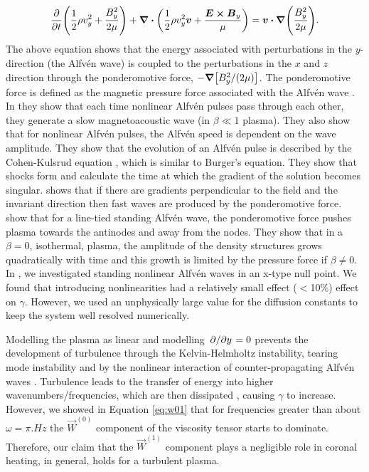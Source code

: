\begin{equation}
    \pdv{}{t}\qty(\frac{1}{2}\rho v_y^2 + \frac{B_y^2}{2\mu}) + \div(\frac{1}{2}\rho v_y^2 \vec{v} + \frac{\vec{E}\cross\vec{B}_y}{\mu})=\vec{v}\vdot\grad(\frac{B_y^2}{2\mu}).
\end{equation}
The above equation shows that the energy associated with perturbations in the $y$-direction (the Alfv\'en wave) is coupled to the perturbations in the $x$ and $z$ direction through the ponderomotive force, $-\grad[B_y^2/(2\mu)]$. The ponderomotive force is defined as the magnetic pressure force associated with the Alfv\'en wave \citep{Verwichte1999}. In \citet{Verwichte1999} they show that each time nonlinear Alfv\'en pulses pass through each other, they generate a slow magnetoacoustic wave (in $\beta\ll1$ plasma). They also show that for nonlinear Alfv\'en pulses, the Alfv\'en speed is dependent on the wave amplitude. They show that the evolution of an Alfv\'en pulse is described by the Cohen-Kulsrud equation \citep{Cohen1974}, which is similar to Burger's equation. They show that shocks form and calculate the time at which the gradient of the solution becomes singular. \citet{Thurgood2013a,Thurgood2013b} shows that if there are gradients perpendicular to the field and the invariant direction then fast waves are produced by the ponderomotive force. \citet{Terradas2006} show that for a line-tied standing Alfv\'en wave, the ponderomotive force pushes plasma towards the antinodes and away from the nodes. They show that in a $\beta=0$, isothermal, plasma, the amplitude of the density structures grows quadratically with time and this growth is limited by the pressure force if $\beta\ne0$. In \citet{Prokopyszyn2019a}, we investigated standing nonlinear Alfv\'en waves in an x-type null point. We found that introducing nonlinearities had a relatively small effect ($<$10\%) effect on $\gamma$. However, we used an unphysically large value for the diffusion constants to keep the system well resolved numerically.

Modelling the plasma as linear and modelling $\pdv*{}{y}=0$ prevents the development of turbulence through the Kelvin-Helmholtz instability, tearing mode instability and by the nonlinear interaction of counter-propagating Alfv\'en waves \citep{Hollweg1986a,vanBallegooijen2011,Shoda2019}. Turbulence leads to the transfer of energy into higher wavenumbers/frequencies, which are then dissipated \citep{Karimabadi2013}, causing $\gamma$ to increase. However, we showed in Equation \eqref{eq:w01} that for frequencies greater than about $\omega=\pi\si{.Hz}$ the $\vec{W}^{(0)}$ component of the viscosity tensor starts to dominate. Therefore, our claim that the $\vec{W}^{(1)}$ component plays a negligible role in coronal heating, in general, holds for a turbulent plasma.


